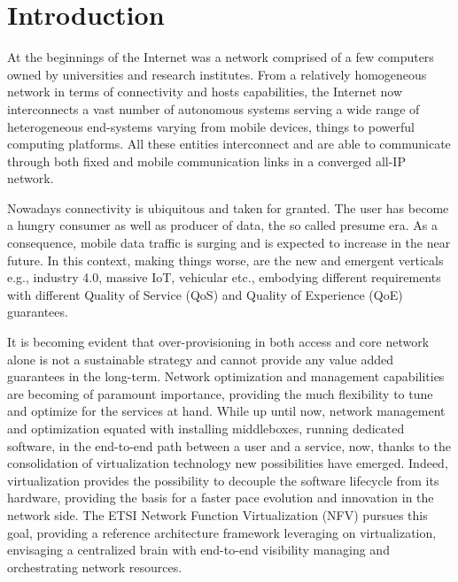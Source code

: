 \chapter{Introduction}
\label{chap:intro}
At the beginnings of the Internet was a network comprised of a few computers
owned by universities and research institutes. From a relatively homogeneous
network in terms of connectivity and hosts capabilities, the Internet now
interconnects a vast number of autonomous systems serving a wide range of
heterogeneous end-systems varying from mobile devices, things to powerful
computing platforms. All these entities interconnect and are able to
communicate through both fixed and mobile communication links in a converged
all-IP network. 

Nowadays connectivity is ubiquitous and taken for granted. The user has become
a hungry consumer as well as producer of data, the so called presume era. As a
consequence, mobile data traffic is surging and is expected to increase in the
near future. In this context, making things worse, are the new and emergent
verticals e.g., industry 4.0, massive IoT, vehicular etc., embodying different
requirements with different Quality of Service (QoS) and Quality of Experience 
(QoE) guarantees. 

It is becoming evident that over-provisioning in both access and core network
alone is not a sustainable strategy and cannot provide any value added
guarantees in the long-term. Network optimization and management capabilities
are becoming of paramount importance, providing the much flexibility to tune
and optimize for the services at hand. While up until now, network management
and optimization equated with installing middleboxes, running dedicated
software, in the end-to-end path between a user and a service, now, thanks to
the consolidation of virtualization technology new possibilities have emerged.
Indeed, virtualization provides the possibility to decouple the software
lifecycle from its hardware, providing the basis for a faster pace evolution
and innovation in the network side. The ETSI Network Function Virtualization 
(NFV) pursues this goal, providing a reference architecture framework leveraging
on virtualization, envisaging a centralized brain with end-to-end visibility
managing and orchestrating network resources.

